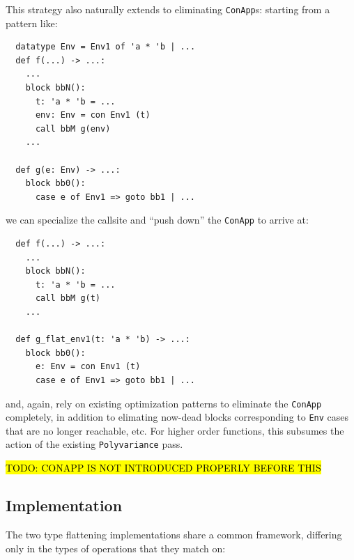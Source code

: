 \documentclass[leqno,11pt]{article}
\begin{document}
This strategy also naturally extends to eliminating \texttt{ConApp}s: starting
from a pattern like:
\begin{verbatim}
  datatype Env = Env1 of 'a * 'b | ...
  def f(...) -> ...:
    ...
    block bbN():
      t: 'a * 'b = ...
      env: Env = con Env1 (t)
      call bbM g(env)
    ...

  def g(e: Env) -> ...:
    block bb0():
      case e of Env1 => goto bb1 | ...
\end{verbatim}
we can specialize the callsite and ``push down'' the \texttt{ConApp} to arrive at:
\begin{verbatim}
  def f(...) -> ...:
    ...
    block bbN():
      t: 'a * 'b = ...
      call bbM g(t)
    ...

  def g_flat_env1(t: 'a * 'b) -> ...:
    block bb0():
      e: Env = con Env1 (t)
      case e of Env1 => goto bb1 | ...
\end{verbatim}
and, again, rely on existing optimization patterns to eliminate the
\texttt{ConApp} completely, in addition to elimating now-dead blocks
corresponding to \texttt{Env} cases that are no longer reachable, etc. For
higher order functions, this subsumes the action of the existing
\texttt{Polyvariance} pass.

\hl{TODO: CONAPP IS NOT INTRODUCED PROPERLY BEFORE THIS}

\subsection{Implementation}
The two type flattening implementations share a common framework, differing only
in the types of operations that they match on:
\end{document}
